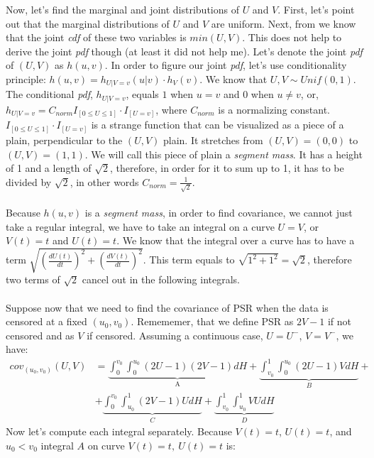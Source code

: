 \documentclass[]{article}
\begin{document}
Now, let's find the marginal and joint distributions of $U$ and $V$. First, let's point out that the marginal distributions of $U$ and $V$ are uniform. Next, from \cite{nelsen2007introduction} we know that the joint \emph{cdf} of these two variables is $min(U, V)$. This does not help to derive the joint \emph{pdf} though (at least it did not help me). Let's denote the joint \emph{pdf} of $(U, V)$ as $h(u, v)$. In order to figure our joint \emph{pdf}, let's use conditionality principle: $h(u, v)=h_{U|V=v}(u|v)\cdot h_V(v)$. We know that $U,V \sim Unif(0, 1)$. The conditional \emph{pdf}, $h_{U|V=v}$, equals $1$ when $u=v$ and $0$ when $u\neq v$, or, $h_{U|V=v} = C_{norm}I_{[0\leq U \leq 1]}\cdot I_{[U=v]}$, where $C_{norm}$ is a normalizing constant. $I_{[0\leq U \leq 1]}\cdot I_{[U=v]}$ is a strange function that can be visualized as a piece of a plain, perpendicular to the $(U,V)$ plain. It stretches from $(U,V) = (0, 0)$ to $(U,V) = (1,1)$. We will call this piece of plain a \emph{segment mass}. It has a height of 1 and a length of $\sqrt{2}$, therefore, in order for it to sum up to 1, it has to be divided by $\sqrt{2}$, in other words $C_{norm}=\frac{1}{\sqrt{2}}$.\\
~\\
Because $h(u, v)$ is a \emph{segment mass}, in order to find covariance, we cannot just take a regular integral, we have to take an integral on a curve $U=V$, or $V(t)=t$ and $U(t) = t$. We know that the integral over a curve has to have a term $\sqrt{\left(\frac{dU(t)}{dt}\right)^2 + \left(\frac{dV(t)}{dt}\right)^2}$. This term equals to $\sqrt{1^2 + 1^2} = \sqrt{2}$, therefore two terms of $\sqrt{2}$ cancel out in the following integrals.\\
~\\
Suppose now that we need to find the covariance of PSR when the data is censored at a fixed $(u_0, v_0)$. Remememer, that we define PSR as $2V - 1$ if not censored and as $V$ if censored. Assuming a continuous case, $U = U^-$, $V = V^-$, we have:
	$$
	\begin{aligned}
    cov_{(u_0, v_0)}(U, V) &= \underbrace{\int_0^{v_0}\int_0^{u_0} (2U - 1)(2V - 1)dH}_{\text{A}} + \underbrace{\int_{v_0}^{1}\int_0^{u_0} (2U - 1)VdH}_{B} + \\
    &+\underbrace{\int_{0}^{v_0}\int_{u_0}^1 (2V - 1)UdH}_{C} + \underbrace{\int_{v_0}^{1}\int_{u_0}^1 VUdH}_{D}
	\end{aligned}
	$$
Now let's compute each integral separately. Because $V(t)=t$, $U(t) = t$, and $u_0 < v_0$ integral $A$ on curve $V(t)=t,~U(t) = t$ is:
\end{document}
